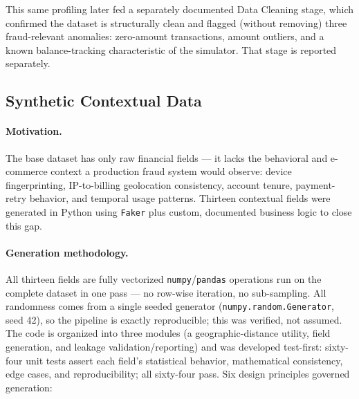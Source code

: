 This same profiling later fed a separately documented Data Cleaning stage, which confirmed the dataset is structurally clean and flagged (without removing) three fraud-relevant anomalies: zero-amount transactions, amount outliers, and a known balance-tracking characteristic of the simulator. That stage is reported separately.

\subsection{Synthetic Contextual Data}
\label{subsec:synthetic-data}

\paragraph{Motivation.} The base dataset has only raw financial fields --- it lacks the behavioral and e-commerce context a production fraud system would observe: device fingerprinting, IP-to-billing geolocation consistency, account tenure, payment-retry behavior, and temporal usage patterns. Thirteen contextual fields were generated in Python using \texttt{Faker} plus custom, documented business logic to close this gap.

\paragraph{Generation methodology.} All thirteen fields are fully vectorized \texttt{numpy}/\texttt{pandas} operations run on the complete dataset in one pass --- no row-wise iteration, no sub-sampling. All randomness comes from a single seeded generator (\texttt{numpy.random.Generator}, seed 42), so the pipeline is exactly reproducible; this was verified, not assumed. The code is organized into three modules (a geographic-distance utility, field generation, and leakage validation/reporting) and was developed test-first: sixty-four unit tests assert each field's statistical behavior, mathematical consistency, edge cases, and reproducibility; all sixty-four pass. Six design principles governed generation:

